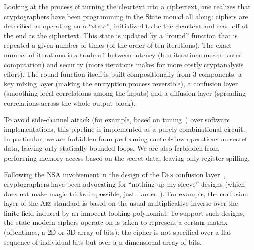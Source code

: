 \documentclass[draft,english]{jflart}
\newcommand{\AES}{\textsc{Aes}}
\newcommand{\DES}{\textsc{Des}}
\begin{document}
Looking at the process of turning the cleartext into a ciphertext, one
realizes that cryptographers have been programming in the State monad
all along: ciphers are described as operating on a ``state'',
initialized to be the cleartext and read off at the end as the
ciphertext. This state is updated by a ``round'' function that is
repeated a given number of times (of the order of ten iterations). The
exact number of iterations is a trade-off between latency (less
iterations means faster computation) and security (more iterations
makes for more costly cryptanalysis effort). The round function itself
is built compositionally from 3 components: a key mixing layer (making
the encryption process reversible), a confusion layer (smoothing local
correlations among the inputs) and a diffusion layer (spreading
correlations across the whole output block).


To avoid side-channel attack (for example, based on
timing~\citep{bernstein:timing-attack-AES}) over software
implementations, this pipeline is implemented as a purely
combinational circuit. In particular, we are forbidden from performing
control-flow operations on secret data, leaving only
statically-bounded loops. We are also forbidden from performing memory
access based on the secret data, leaving only register spilling.


Following the NSA involvement in the design of the \DES{} confusion
layer~\citep{johnson:cold-war-crypto}, cryptographers have been
advocating for ``nothing-up-my-sleeve'' designs (which does not make
magic tricks impossible, just
harder~\citep{bernstein:something-up-my-sleeves}). For example, the
confusion layer of the \AES{} standard is based on the usual
multiplicative inverse over the finite field induced by an
innocent-looking polynomial. To support such designs, the state modern
ciphers operate on is taken to represent a certain matrix
(oftentimes, a 2D or 3D array of bits): the cipher is not specified
over a flat sequence of individual bits but over a n-dimensional array
of bits.

\end{document}
